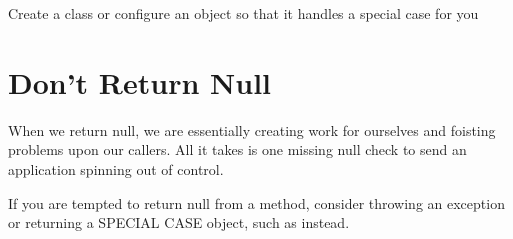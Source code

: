 \begin{marker}
Create a class or configure an object so that it handles a special case for you
\end{marker}

\section{Don’t Return Null}

When we return null, we are essentially creating work for ourselves and foisting
problems upon our callers. All it takes is one missing null check to send an application spinning out of control.

\begin{marker}
If you are tempted to return null from a method, consider throwing an exception or returning a SPECIAL CASE object, such as  instead.
\end{marker}
